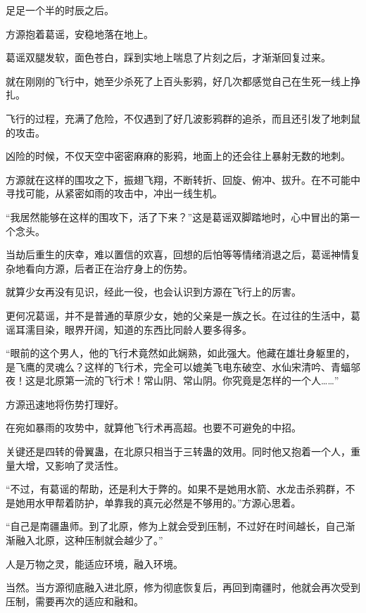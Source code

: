 
\begin{this_body}



足足一个半的时辰之后。

方源抱着葛谣，安稳地落在地上。

葛谣双腿发软，面色苍白，踩到实地上喘息了片刻之后，才渐渐回复过来。

就在刚刚的飞行中，她至少杀死了上百头影鸦，好几次都感觉自己在生死一线上挣扎。

飞行的过程，充满了危险，不仅遇到了好几波影鸦群的追杀，而且还引发了地刺鼠的攻击。

凶险的时候，不仅天空中密密麻麻的影鸦，地面上的还会往上暴射无数的地刺。

方源就在这样的围攻之下，振翅飞翔，不断转折、回旋、俯冲、拔升。在不可能中寻找可能，从紧密如雨的攻击中，冲出一线生机。

“我居然能够在这样的围攻下，活了下来？”这是葛谣双脚踏地时，心中冒出的第一个念头。

当劫后重生的庆幸，难以置信的欢喜，回想的后怕等等情绪消退之后，葛谣神情复杂地看向方源，后者正在治疗身上的伤势。

就算少女再没有见识，经此一役，也会认识到方源在飞行上的厉害。

更何况葛谣，并不是普通的草原少女，她的父亲是一族之长。在过往的生活中，葛谣耳濡目染，眼界开阔，知道的东西比同龄人要多得多。

“眼前的这个男人，他的飞行术竟然如此娴熟，如此强大。他藏在雄壮身躯里的，是飞鹰的灵魂么？这样的飞行术，完全可以媲美飞电东破空、水仙宋清吟、青蝠邬夜！这是北原第一流的飞行术！常山阴、常山阴。你究竟是怎样的一个人……”

方源迅速地将伤势打理好。

在宛如暴雨的攻势中，就算他飞行术再高超。也要不可避免的中招。

关键还是四转的骨翼蛊，在北原只相当于三转蛊的效用。同时他又抱着一个人，重量大增，又影响了灵活性。

“不过，有葛谣的帮助，还是利大于弊的。如果不是她用水箭、水龙击杀鸦群，不是她用水甲帮着防护，单靠我的真元必然是不够用的。”方源心思着。

“自己是南疆蛊师。到了北原，修为上就会受到压制，不过好在时间越长，自己渐渐融入北原，这种压制就会越少了。”

人是万物之灵，能适应环境，融入环境。

当然。当方源彻底融入进北原，修为彻底恢复后，再回到南疆时，他就会再次受到压制，需要再次的适应和融和。


\end{this_body}
